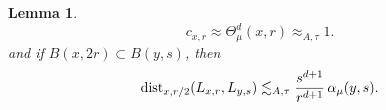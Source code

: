 \documentclass[11pt]{amsart}
\newcommand{\LL}{{\mathcal L}}
\newcommand{\dist}{{\rm dist}}
\newcommand{\ve}{{\varepsilon}}
\def\Xint#1{\mathchoice
{\XXint\displaystyle\textstyle{#1}}%
{\XXint\textstyle\scriptstyle{#1}}%
{\XXint\scriptstyle\scriptscriptstyle{#1}}%
{\XXint\scriptscriptstyle\scriptscriptstyle{#1}}%
\!\int}
\def\XXint#1#2#3{{\setbox0=\hbox{$#1{#2#3}{\int}$ }
\vcenter{\hbox{$#2#3$ }}\kern-.58\wd0}}
\def\avint{\Xint-}
\newtheorem{lemma}[theorem]{Lemma}
\theoremstyle{definition}
\theoremstyle{remark}
\numberwithin{equation}{section}
\def\cH{{\mathcal{H}}}
\newcommand{\ps}[1]{\left( #1 \right)}
\def\gec{\gtrsim}
\def\lec{\lesssim}
\def\lec{\lesssim}
\def\Lip{\textrm{Lip}}
\begin{document}
\begin{lemma}
	\begin{equation}\label{e:cb-mub}
c_{x,r} \approx \Theta^d_{\mu}(x,r) \approx_{A,\tau} 1.
\end{equation}
%
%
%
%
and if $B(x,2r)\subset B(y,s)$, then
	\begin{equation}\label{e:angle}
	\dist_{x,r/2}(L_{x,r},L_{y,s})\lec_{A,\tau} \frac{s^{d+1}}{r^{d+1}}\,\alpha_{\mu}(y,s).
	\end{equation}
%


\end{lemma}
\end{document}
